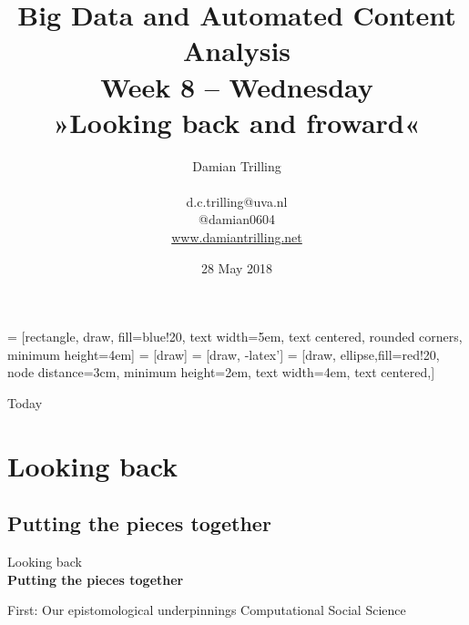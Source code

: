 \documentclass{beamer}
\begin{document}
\title[Big Data and Automated Content Analysis]{\textbf{Big Data and Automated Content Analysis} \\ Week 8 -- Wednesday \\ »Looking back and froward«}
\author[Damian Trilling]{Damian Trilling \\ ~ \\ \footnotesize{d.c.trilling@uva.nl \\@damian0604} \\ \url{www.damiantrilling.net}}
\date{28 May 2018}




 = [rectangle, draw, fill=blue!20, 
text width=5em, text centered, rounded corners, minimum height=4em]
 = [draw]
 = [draw, -latex']
 = [draw, ellipse,fill=red!20, node distance=3cm,
minimum height=2em, text width=4em, text centered,]

















\begin{frame}{}
\titlepage
\end{frame}

\begin{frame}{Today}
\tableofcontents
\end{frame}




\section{Looking back}
\subsection{Putting the pieces together}
\begin{frame}[plain]{}
Looking back\\
\textbf{Putting the pieces together}
\end{frame}


\begin{frame}{First: Our epistomological underpinnings}
	Computational Social Science
\end{frame}
\end{document}
